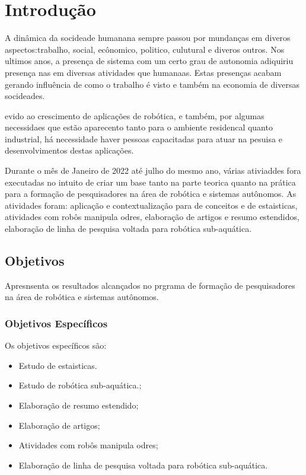 \chapter{Introdução}
\label{chap:intro}

A dinâmica da socideade humanana sempre passou por mundanças em diveros aspectos:trabalho, social, ecônomico, politico, culutural e diveros outros. Nos ultimos anos, a presença de sistema com um certo grau de autonomia adiquiriu presença nas em diversas atividades que humanaas. Estas presenças acabam gerando influência de como o trabalho é visto e também na economia de diversas socideades.

evido ao crescimento de aplicações de robótica, e também, por algumas necessidaes que estão aparecento tanto para o ambiente residencal quanto industrial, há necessidade haver pessoas capacitadas para atuar na pesuisa e desenvolvimentos destas aplicações.

Durante o mês de Janeiro de 2022 até julho do mesmo ano, várias ativiaddes fora executadas no intuito de criar um base tanto na parte teorica quanto na prática para a formação de pesquisadores na área de robótica e sistemas autônomos.  As atividades foram: aplicação e contextualização para de conceitos e de estaisticas, atividades com robôs manipula odres, elaboração de artigos e resumo estendidos, elaboração de linha de pesquisa voltada para robótica sub-aquática.


\section{Objetivos}
\label{sec:obj}
Apresnsenta os resultados alcançados no prgrama de formação de pesquisadores na área de robótica e sistemas autônomos.
\label{sec:obj}

\subsection{Objetivos Específicos}
\label{ssec:objesp}
Os objetivos específicos são:
\begin{itemize}
      \item Estudo de estaisticas.
      \item Estudo de robótica sub-aquática.;
      \item Elaboração de resumo estendido;
      \item Elaboração de artigos;
      \item Atividades com robôs manipula odres;
      \item Elaboração de linha de pesquisa voltada para robótica sub-aquática.
    
  \end{itemize}



